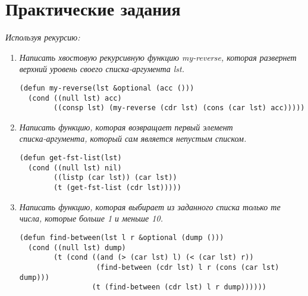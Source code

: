 \chapter{Практические задания}
\textit{Используя рекурсию:}
\begin{enumerate}[wide=0pt]
\item \textit{Написать хвостовую рекурсивную функцию my-reverse, которая развернет верхний уровень своего списка-аргумента lst.}
\begin{lstlisting}
(defun my-reverse(lst &optional (acc ()))
  (cond ((null lst) acc)
        ((consp lst) (my-reverse (cdr lst) (cons (car lst) acc)))))	
\end{lstlisting}

\item \textit{ Написать функцию, которая возвращает первый элемент \\ списка-аргумента, который сам является непустым списком.}
\begin{lstlisting}
(defun get-fst-list(lst)
  (cond ((null lst) nil)
        ((listp (car lst)) (car lst))
        (t (get-fst-list (cdr lst)))))
\end{lstlisting}

\item \textit{Написать функцию, которая выбирает из заданного списка только те числа, которые больше 1 и меньше 10.}
\begin{lstlisting}
(defun find-between(lst l r &optional (dump ()))
  (cond ((null lst) dump)
        (t (cond ((and (> (car lst) l) (< (car lst) r))
                  (find-between (cdr lst) l r (cons (car lst) dump)))
                 (t (find-between (cdr lst) l r dump))))))
\end{lstlisting}


\end{enumerate}
